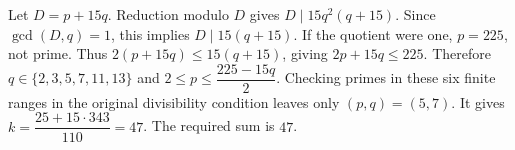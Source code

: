 Let $D=p+15q$. Reduction modulo $D$ gives $D\mid15q^2(q+15)$. Since $\gcd(D,q)=1$, this implies $D\mid15(q+15)$. If the quotient were one, $p=225$, not prime. Thus $2(p+15q)\le15(q+15)$, giving $2p+15q\le225$. Therefore $q\in\{2,3,5,7,11,13\}$ and $2\le p\le\dfrac{225-15q}{2}$. Checking primes in these six finite ranges in the original divisibility condition leaves only $(p,q)=(5,7)$. It gives $k=\dfrac{25+15\cdot343}{110}=47$. The required sum is $\boxed{47}$.
